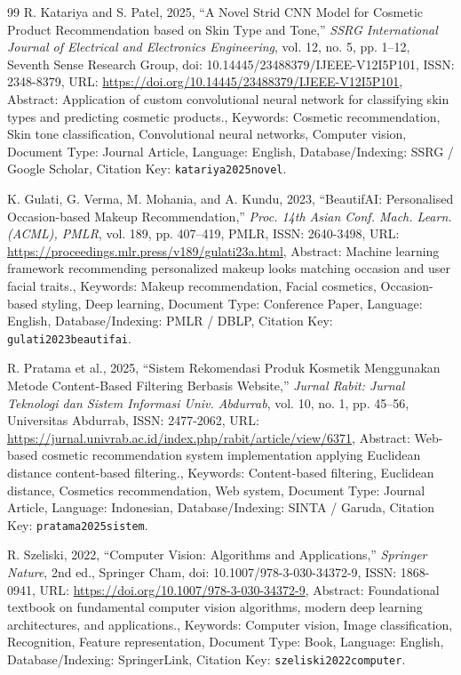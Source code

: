 \documentclass[10pt,a4paper]{article}
\begin{document}
\begin{thebibliography}{99}
R. Katariya and S. Patel, 2025, ``A Novel Strid CNN Model for Cosmetic Product Recommendation based on Skin Type and Tone,'' \textit{SSRG International Journal of Electrical and Electronics Engineering}, vol. 12, no. 5, pp. 1--12, Seventh Sense Research Group, doi: 10.14445/23488379/IJEEE-V12I5P101, ISSN: 2348-8379, URL: \url{https://doi.org/10.14445/23488379/IJEEE-V12I5P101}, Abstract: Application of custom convolutional neural network for classifying skin types and predicting cosmetic products., Keywords: Cosmetic recommendation, Skin tone classification, Convolutional neural networks, Computer vision, Document Type: Journal Article, Language: English, Database/Indexing: SSRG / Google Scholar, Citation Key: \texttt{katariya2025novel}.

K. Gulati, G. Verma, M. Mohania, and A. Kundu, 2023, ``BeautifAI: Personalised Occasion-based Makeup Recommendation,'' \textit{Proc. 14th Asian Conf. Mach. Learn. (ACML), PMLR}, vol. 189, pp. 407--419, PMLR, ISSN: 2640-3498, URL: \url{https://proceedings.mlr.press/v189/gulati23a.html}, Abstract: Machine learning framework recommending personalized makeup looks matching occasion and user facial traits., Keywords: Makeup recommendation, Facial cosmetics, Occasion-based styling, Deep learning, Document Type: Conference Paper, Language: English, Database/Indexing: PMLR / DBLP, Citation Key: \texttt{gulati2023beautifai}.

R. Pratama et al., 2025, ``Sistem Rekomendasi Produk Kosmetik Menggunakan Metode Content-Based Filtering Berbasis Website,'' \textit{Jurnal Rabit: Jurnal Teknologi dan Sistem Informasi Univ. Abdurrab}, vol. 10, no. 1, pp. 45--56, Universitas Abdurrab, ISSN: 2477-2062, URL: \url{https://jurnal.univrab.ac.id/index.php/rabit/article/view/6371}, Abstract: Web-based cosmetic recommendation system implementation applying Euclidean distance content-based filtering., Keywords: Content-based filtering, Euclidean distance, Cosmetics recommendation, Web system, Document Type: Journal Article, Language: Indonesian, Database/Indexing: SINTA / Garuda, Citation Key: \texttt{pratama2025sistem}.

R. Szeliski, 2022, ``Computer Vision: Algorithms and Applications,'' \textit{Springer Nature}, 2nd ed., Springer Cham, doi: 10.1007/978-3-030-34372-9, ISSN: 1868-0941, URL: \url{https://doi.org/10.1007/978-3-030-34372-9}, Abstract: Foundational textbook on fundamental computer vision algorithms, modern deep learning architectures, and applications., Keywords: Computer vision, Image classification, Recognition, Feature representation, Document Type: Book, Language: English, Database/Indexing: SpringerLink, Citation Key: \texttt{szeliski2022computer}.


\end{thebibliography}
\end{document}
